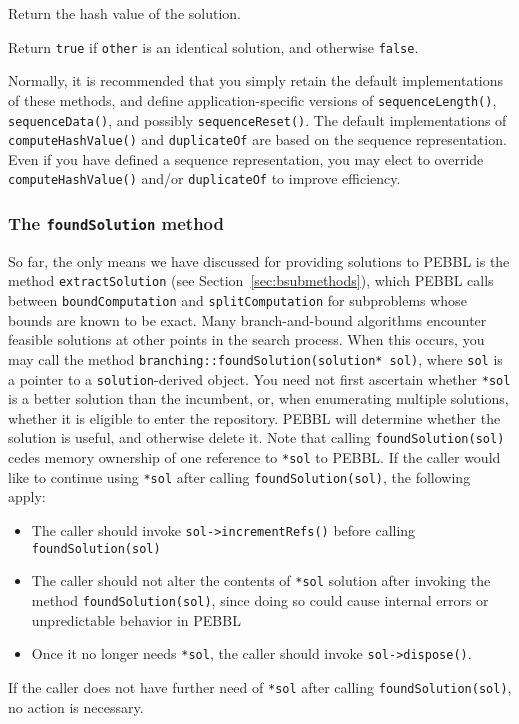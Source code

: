  Return the hash value of the
solution.

 Return \texttt{true} if
\texttt{other} is an identical solution, and otherwise
\texttt{false}. 

\vspace{2ex}

Normally, it is recommended that you simply retain the default
implementations of these methods, and define application-specific
versions of \texttt{sequenceLength()}, \texttt{sequenceData()}, and
possibly \texttt{sequenceReset()}.  The default implementations of
\texttt{computeHashValue()} and \texttt{duplicateOf} are based on the
sequence representation.  Even if you have defined a sequence
representation, you may elect to override \texttt{computeHashValue()}
and/or \texttt{duplicateOf} to improve efficiency.


\subsubsection{The \texttt{foundSolution} method}
So far, the only means we have discussed for providing solutions to
PEBBL is the method \texttt{extractSolution} (see
Section~\ref{sec:bsubmethods}), which PEBBL calls between
\texttt{boundComputation} and \texttt{splitComputation} for
subproblems whose bounds are known to be exact.  Many branch-and-bound
algorithms encounter feasible solutions at other points in the search
process.  When this occurs, you may call the method
\texttt{branching::foundSolution(solution* sol)}, where \texttt{sol}
is a pointer to a \texttt{solution}-derived object.  You need not
first ascertain whether \texttt{*sol} is a better solution than the
incumbent, or, when enumerating multiple solutions, whether it is
eligible to enter the repository.  PEBBL will determine whether the
solution is useful, and otherwise delete it.  Note that calling
\texttt{foundSolution(sol)} cedes memory ownership of one reference to
\texttt{*sol} to PEBBL.  If the caller would like to continue using
\texttt{*sol} after calling \texttt{foundSolution(sol)}, the following apply:
\begin{itemize}
\item The caller should invoke \texttt{sol->incrementRefs()} before calling 
\texttt{foundSolution(sol)}
\item The caller should not alter the contents of \texttt{*sol}
solution after invoking the method
\texttt{foundSolution(sol)}, since doing so could cause
internal errors or unpredictable behavior in PEBBL
\item Once it no longer needs \texttt{*sol}, the caller should invoke
\texttt{sol->dispose()}.
\end{itemize}
If the caller does not have further need of \texttt{*sol} after calling
\texttt{foundSolution(sol)}, no action is necessary.

